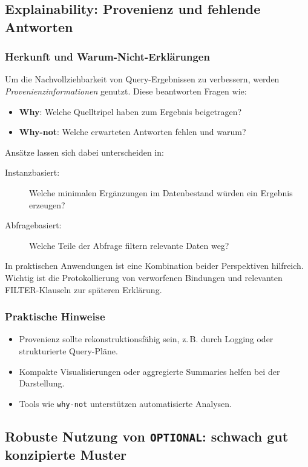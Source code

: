 \subsection{Explainability: Provenienz und fehlende Antworten}

\subsubsection{Herkunft und Warum-Nicht-Erklärungen}
Um die Nachvollziehbarkeit von Query-Ergebnissen zu verbessern, werden \emph{Provenienzinformationen} genutzt. Diese beantworten Fragen wie:
\begin{itemize}
\item \textbf{Why}: Welche Quelltripel haben zum Ergebnis beigetragen?
\item \textbf{Why-not}: Welche erwarteten Antworten fehlen und warum?
\end{itemize}
Ansätze lassen sich dabei unterscheiden in:
\begin{description}
\item[Instanzbasiert:] Welche minimalen Ergänzungen im Datenbestand würden ein Ergebnis erzeugen?
\item[Abfragebasiert:] Welche Teile der Abfrage filtern relevante Daten weg?
\end{description}
In praktischen Anwendungen ist eine Kombination beider Perspektiven hilfreich. Wichtig ist die Protokollierung von verworfenen Bindungen und relevanten FILTER-Klauseln zur späteren Erklärung.

\subsubsection{Praktische Hinweise}
\begin{itemize}
\item Provenienz sollte rekonstruktionsfähig sein, z.\,B. durch Logging oder strukturierte Query-Pläne.
\item Kompakte Visualisierungen oder aggregierte Summaries helfen bei der Darstellung.
\item Tools wie \texttt{why-not} \cite{herschel-why-why-not} unterstützen automatisierte Analysen.
\end{itemize}

\subsection{Robuste Nutzung von \texttt{OPTIONAL}: schwach gut konzipierte Muster}

